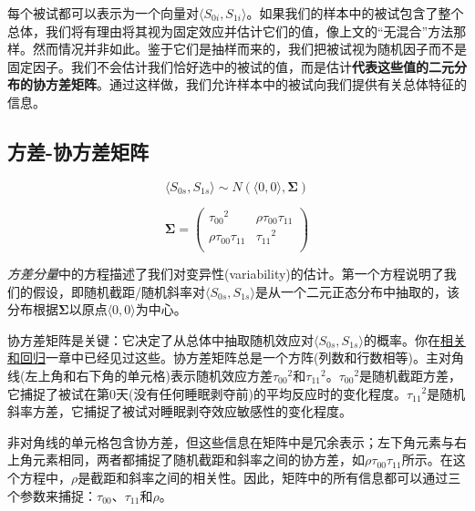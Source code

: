 \documentclass[
]{book}
\begin{document}
每个被试都可以表示为一个向量对\(\langle S_{0i}, S_{1i} \rangle\)。如果我们的样本中的被试包含了整个总体，我们将有理由将其视为固定效应并估计它们的值，像上文的``无混合''方法那样。然而情况并非如此。鉴于它们是抽样而来的，我们把被试视为随机因子而不是固定因子。我们不会估计我们恰好选中的被试的值，而是估计\textbf{代表这些值的二元分布的协方差矩阵}。通过这样做，我们允许样本中的被试向我们提供有关总体特征的信息。

\hypertarget{ux65b9ux5dee-ux534fux65b9ux5deeux77e9ux9635}{%
\subsection{方差-协方差矩阵}\label{ux65b9ux5dee-ux534fux65b9ux5deeux77e9ux9635}}

\begin{equation}
 \langle S_{0s}, S_{1s} \rangle \sim N\left(\langle 0, 0 \rangle, \mathbf{\Sigma}\right) 
\end{equation}

\begin{equation}
\mathbf{\Sigma} = \left(\begin{array}{cc}{\tau_{00}}^2 & \rho\tau_{00}\tau_{11} \\
         \rho\tau_{00}\tau_{11} & {\tau_{11}}^2 \\
         \end{array}\right) 
\end{equation}

\emph{方差分量}中的方程描述了我们对变异性(variability)的估计。第一个方程说明了我们的假设，即随机截距/随机斜率对\(\langle S_{0s}, S_{1s} \rangle\)是从一个二元正态分布中抽取的，该分布根据\(\mathbf{\Sigma}\)以原点\(\langle 0, 0 \rangle\)为中心。

协方差矩阵是关键：它决定了从总体中抽取随机效应对\(\langle S_{0s}, S_{1s} \rangle\)的概率。你在\protect\hyperlink{ux76f8ux5173ux548cux56deux5f52}{相关和回归}一章中已经见过这些。协方差矩阵总是一个方阵(列数和行数相等)。主对角线(左上角和右下角的单元格)表示随机效应方差\({\tau_{00}}^2\)和\({\tau_{11}}^2\)。\({\tau_{00}}^2\)是随机截距方差，它捕捉了被试在第0天(没有任何睡眠剥夺前)的平均反应时的变化程度。\({\tau_{11}}^2\)是随机斜率方差，它捕捉了被试对睡眠剥夺效应敏感性的变化程度。

非对角线的单元格包含协方差，但这些信息在矩阵中是冗余表示；左下角元素与右上角元素相同，两者都捕捉了随机截距和斜率之间的协方差，如\(\rho\tau_{00}\tau_{11}\)所示。在这个方程中，\(\rho\)是截距和斜率之间的相关性。因此，矩阵中的所有信息都可以通过三个参数来捕捉：\(\tau_{00}\)、\(\tau_{11}\)和\(\rho\)。
\end{document}

